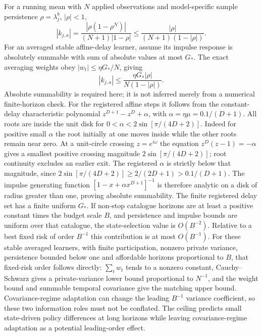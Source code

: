 For a running mean with $N$ applied observations and model-specific sample persistence $\rho=\lambda_j^b$, $|\rho|<1$,
\[
|k_{j,a}|=\frac{|\rho(1-\rho^N)|}{(N+1)|1-\rho|}
\le\frac{|\rho|}{(N+1)(1-|\rho|)}.
\]
For an averaged stable affine-delay learner, assume its impulse response is absolutely summable with sum of absolute values at most $G_*$.
The exact averaging weights obey $|w_t|\le\eta G_*/N$, giving
\[
|k_{j,a}|\le\frac{\eta G_*|\rho|}{N(1-|\rho|)}.
\]
Absolute summability is required here; it is not inferred merely from a numerical finite-horizon check.
For the registered affine steps it follows from the constant-delay characteristic polynomial $z^{D+1}-z^D+\alpha$, with $\alpha=\eta\mu=0.1/(D+1)$.
All roots are inside the unit disk for $0<\alpha<2\sin[\pi/(4D+2)]$.
Indeed for positive small $\alpha$ the root initially at one moves inside while the other roots remain near zero.
At a unit-circle crossing $z=e^{i\omega}$ the equation $z^D(z-1)=-\alpha$ gives a smallest positive crossing magnitude $2\sin[\pi/(4D+2)]$; root continuity excludes an earlier exit.
The registered $\alpha$ is strictly below that magnitude, since $2\sin[\pi/(4D+2)]\ge2/(2D+1)>0.1/(D+1)$.
The impulse generating function $[1-x+\alpha x^{D+1}]^{-1}$ is therefore analytic on a disk of radius greater than one, proving absolute summability.
The finite registered delay set has a finite uniform $G_*$.
If non-stop catalogue horizons are at least a positive constant times the budget scale $B$, and persistence and impulse bounds are uniform over that catalogue, the state-selection value is $O(B^{-2})$.
Relative to a best fixed risk of order $B^{-1}$ this contribution is at most $O(B^{-1})$.
For these stable averaged learners, with finite participation, nonzero private variance, persistence bounded below one and affordable horizons proportional to $B$, that fixed-risk order follows directly: $\sum_tw_t$ tends to a nonzero constant, Cauchy--Schwarz gives a private-variance lower bound proportional to $N^{-1}$, and the weight bound and summable temporal covariance give the matching upper bound.
Covariance-regime adaptation can change the leading $B^{-1}$ variance coefficient, so these two information roles must not be conflated.
The ceiling predicts small state-driven policy differences at long horizons while leaving covariance-regime adaptation as a potential leading-order effect.

